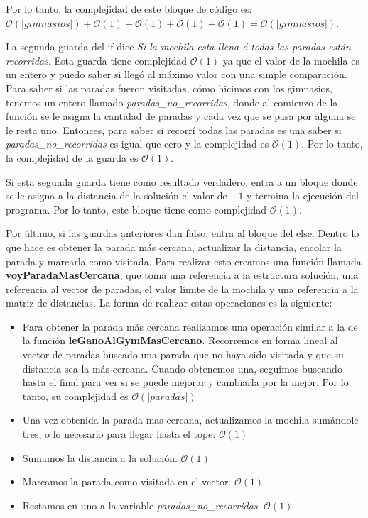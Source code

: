 Por lo tanto, la complejidad de este bloque de código es: $\mathcal{O}(|gimnasios|) + \mathcal{O}(1) + \mathcal{O}(1) + \mathcal{O}(1) + \mathcal{O}(1) = \mathcal{O}(|gimnasios|)$.

La segunda guarda del if dice \textit{Si la mochila esta llena ó todas las paradas están recorridas}. Esta guarda tiene complejidad $\mathcal{O}(1)$ ya que el valor de la mochila es un entero y puedo saber si llegó al máximo valor con una simple comparación. Para saber si las paradas fueron visitadas, cómo hicimos con los gimnasios, tenemos un entero llamado \emph{paradas\_no\_recorridas}, donde al comienzo de la función se le asigna la cantidad de paradas y cada vez que se pasa por alguna se le resta uno. Entonces, para saber si recorrí todas las paradas es una saber si \emph{paradas\_no\_recorridas} es igual que cero y la complejidad es $\mathcal{O}(1)$. Por lo tanto, la complejidad de la guarda es $\mathcal{O}(1)$.

Si esta segunda guarda tiene como resultado verdadero, entra a un bloque donde se le asigna a la distancia de la solución el valor de $-1$ y termina la ejecución del programa. Por lo tanto, este bloque tiene como complejidad $\mathcal{O}(1)$.

Por último, si las guardas anteriores dan falso, entra al bloque del else. Dentro lo que hace es obtener la parada más cercana, actualizar la distancia, encolar la parada y marcarla como visitada. Para realizar esto creamos una función llamada \textbf{voyParadaMasCercana}, que toma una referencia a la estructura solución, una referencia al vector de paradas, el valor límite de la mochila y una referencia a la matriz de distancias. La forma de realizar estas operaciones es la siguiente:

\begin{itemize}

	\item Para obtener la parada más cercana realizamos una operación similar a la de la función \textbf{leGanoAlGymMasCercano}. Recorremos en forma lineal al vector de paradas buscado una parada que no haya sido visitada y que su distancia sea la más cercana. Cuando obtenemos una, seguimos buscando hasta el final para ver si se puede mejorar y cambiarla por la mejor. Por lo tanto, su complejidad es $\mathcal{O}(|paradas|)$
	\item Una vez obtenida la parada mas cercana, actualizamos la mochila sumándole tres, o lo necesario para llegar hasta el tope. $\mathcal{O}(1)$
	\item Sumamos la distancia a la solución. $\mathcal{O}(1)$
	\item Marcamos la parada como visitada en el vector. $\mathcal{O}(1)$
	\item Restamos en uno a la variable \emph{paradas\_no\_recorridas}. $\mathcal{O}(1)$

\end{itemize}


